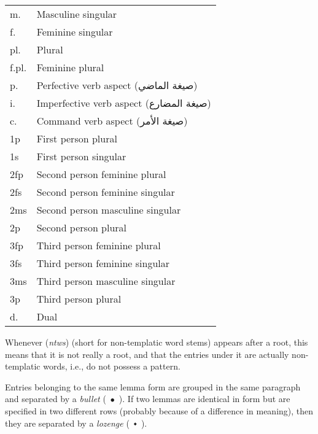 \documentclass[11pt]{book}
\begin{document}
\begin{table}[h]
  \begin{tabular}{ll}
  m.    & Masculine singular               \\
  f.    & Feminine singular                \\
  pl.   & Plural                           \\
  f.pl. & Feminine plural                  \\
  p.    & Perfective verb aspect (\foreignlanguage{arabic}{صيغة الماضي})                \\
  i.    & Imperfective verb aspect (\foreignlanguage{arabic}{صيغة المضارع})              \\
  c.    & Command verb aspect (\foreignlanguage{arabic}{صيغة الأمر})                   \\
  1p    & First person plural              \\
  1s    & First person singular            \\
  2fp   & Second person feminine plural    \\
  2fs   & Second person feminine singular  \\
  2ms   & Second person masculine singular \\
  2p    & Second person plural             \\
  3fp   & Third person feminine plural     \\
  3fs   & Third person feminine singular   \\
  3ms   & Third person masculine singular  \\
  3p    & Third person plural              \\
  d.    & Dual                             \\
  \end{tabular}
\end{table}

\vspace{5mm}

Whenever (\textit{ntws}) (short for non-templatic word stems) appears after a root, this means that it is not really a root, and that the entries under it are actually non-templatic words, i.e., do not possess a pattern.

\vspace{5mm}
Entries belonging to the same lemma form are grouped in the same paragraph and separated by a \textit{bullet} (\ $\bullet$\ ). If two lemmas are identical in form but are specified in two different rows (probably because of a difference in meaning), then they are separated by a \textit{lozenge} (\ $\smblkdiamond$\ ). 
\end{document}

